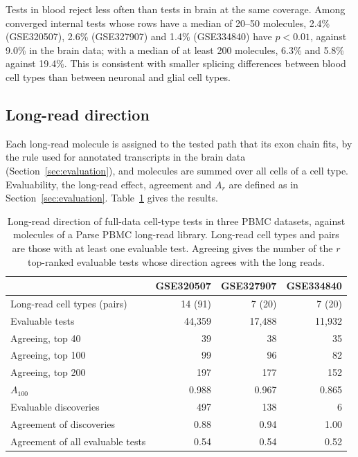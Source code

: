 \documentclass[11pt]{article}
\begin{document}
Tests in blood reject less often than tests in brain at the same coverage. Among converged internal tests whose rows have a median of 20--50 molecules, 2.4\% (GSE320507), 2.6\% (GSE327907) and 1.4\% (GSE334840) have $p<0.01$, against 9.0\% in the brain data; with a median of at least 200 molecules, 6.3\% and 5.8\% against 19.4\%. This is consistent with smaller splicing differences between blood cell types than between neuronal and glial cell types.

\subsection{Long-read direction}

Each long-read molecule is assigned to the tested path that its exon chain fits, by the rule used for annotated transcripts in the brain data (Section~\ref{sec:evaluation}), and molecules are summed over all cells of a cell type. Evaluability, the long-read effect, agreement and $A_r$ are defined as in Section~\ref{sec:evaluation}. Table~\ref{tab:pbmc-lr} gives the results.

\begin{table}[ht]
\centering
\small
\begin{tabular}{lrrr}
\toprule
 & GSE320507 & GSE327907 & GSE334840\\
\midrule
Long-read cell types (pairs) & 14 (91) & 7 (20) & 7 (20)\\
Evaluable tests & 44{,}359 & 17{,}488 & 11{,}932\\
Agreeing, top 40 & 39 & 38 & 35\\
Agreeing, top 100 & 99 & 96 & 82\\
Agreeing, top 200 & 197 & 177 & 152\\
$A_{100}$ & 0.988 & 0.967 & 0.865\\
Evaluable discoveries & 497 & 138 & 6\\
Agreement of discoveries & 0.88 & 0.94 & 1.00\\
Agreement of all evaluable tests & 0.54 & 0.54 & 0.52\\
\bottomrule
\end{tabular}
\caption{Long-read direction of full-data cell-type tests in three PBMC datasets, against molecules of a Parse PBMC long-read library. Long-read cell types and pairs are those with at least one evaluable test. Agreeing gives the number of the $r$ top-ranked evaluable tests whose direction agrees with the long reads.}
\label{tab:pbmc-lr}
\end{table}
\end{document}

